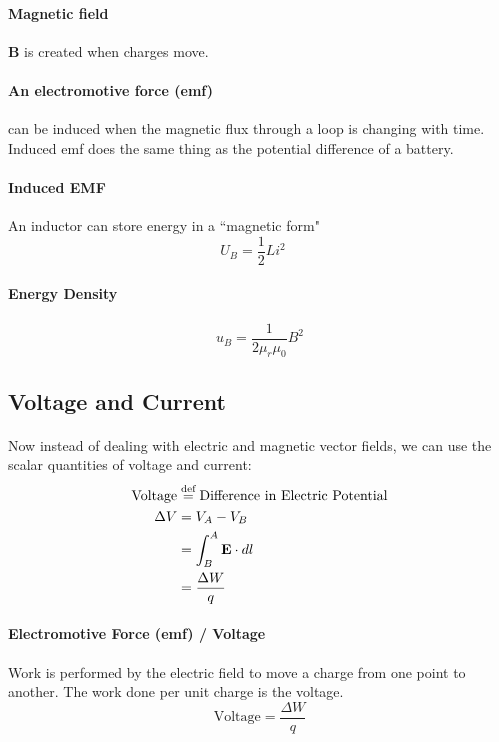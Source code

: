 \documentclass[11pt]{article}
\begin{document}
\paragraph{Magnetic field} \textbf{B} is created when charges move.
\paragraph{An electromotive force (emf)} can be induced when the magnetic flux
through a loop is changing with time. Induced emf does the same thing as the potential difference of a
battery. 
\paragraph{Induced EMF} An inductor can store energy in a ``magnetic form"
\begin{equation}
    U_B = \frac{1}{2} L i^2 \quad 
\end{equation}
\paragraph{Energy Density}
\begin{equation}
    u_B = \frac{1}{2 \mu_r \mu_0} B^2
\end{equation}
\subsection{Voltage and Current}
\paragraph{} Now instead of dealing with electric and magnetic vector fields, we can
use the scalar quantities of voltage and current:
\begin{align}
    \text{Voltage} &\stackrel{\text{def}}{=} \text{Difference in Electric Potential}\nonumber \\ 
    \Delta V &= V_A - V_B \nonumber \\
    &= \int_B^A \textbf{E} \cdot dl \nonumber\\
    &= \frac{\Delta W}{q}
\end{align}

\paragraph{Electromotive Force (emf) / Voltage} Work is performed by 
the electric field to move a charge from one point to another. 
The work done per unit charge is the voltage.
\begin{equation}
    \text{Voltage} = \frac{\Delta W}{q}
\end{equation}
\end{document}
